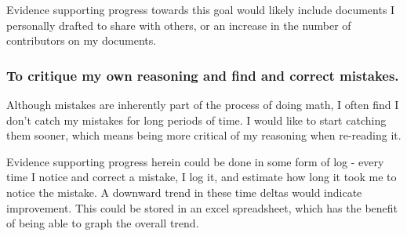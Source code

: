 \documentclass[11pt, letterpaper]{report}
\begin{document}
Evidence supporting progress towards this goal would likely include documents I personally drafted to share with others, or an increase in the number of contributors on my documents.
\subsubsection{To critique my own reasoning and find and correct mistakes.}
Although mistakes are inherently part of the process of doing math, I often find I don't catch my mistakes for long periods of time. I would like to start catching them sooner, which means being more critical of my reasoning when re-reading it.

Evidence supporting progress herein could be done in some form of log - every time I notice and correct a mistake, I log it, and estimate how long it took me to notice the mistake. A downward trend in these time deltas would indicate improvement. This could be stored in an excel spreadsheet, which has the benefit of being able to graph the overall trend.
\end{document}
